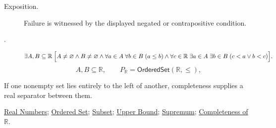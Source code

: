 \begin{remark*}
\begin{description}
  \item[Exposition.]
  Failure is witnessed by the displayed negated or contrapositive condition.

  \item[.]
  \[
\exists A,B\subseteq\mathbb{R}\;
\Bigl[
A\ne\varnothing\land B\ne\varnothing\land
\forall a\in A\;\forall b\in B\;(a\le b)
\land
\forall c\in\mathbb{R}\;\exists a\in A\;\exists b\in B\;(c<a\lor b<c)
\Bigr].
\]
\[
A,B\subseteq\mathbb{R},\qquad P_{\mathbb{R}}=\mathsf{OrderedSet}(\mathbb{R},\leq),
\]
\end{description}
\end{remark*}
\begin{remark*}[Interpretation]
If one nonempty set lies entirely to the left of another, completeness supplies
a real separator between them.
\end{remark*}
\begin{dependencies}
\hyperref[def:reals]{Real Numbers};
\hyperref[def:ordered-set]{Ordered Set};
\hyperref[def:subset]{Subset};
\hyperref[def:real-upper-bound]{Upper Bound};
\hyperref[def:supremum]{Supremum};
\hyperref[ax:completeness-of-reals]{Completeness of $\mathbb{R}$}.
\end{dependencies}


